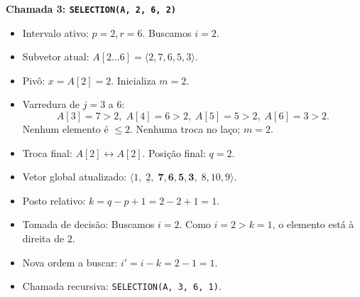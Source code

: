 \documentclass[11pt,a4paper]{article}
\newcommand{\destaque}[1]{\textbf{\color{azul}#1}}
\begin{document}
\vspace{4pt}
\destaque{Chamada 3: \texttt{SELECTION(A, 2, 6, 2)}}
\begin{itemize}
    \item Intervalo ativo: $p = 2, r = 6$. Buscamos $i = 2$.
    \item Subvetor atual: $A[2 \dots 6] = \langle 2, 7, 6, 5, 3 \rangle$.
    \item Pivô: $x = A[2] = 2$. Inicializa $m = 2$.
    \item Varredura de $j = 3$ a $6$:
    \[
    A[3]=7 > 2, \; A[4]=6 > 2, \; A[5]=5 > 2, \; A[6]=3 > 2.
    \]
    Nenhum elemento é $\le 2$. Nenhuma troca no laço; $m = 2$.
    \item Troca final: $A[2] \leftrightarrow A[2]$. Posição final: $q = 2$.
    \item Vetor global atualizado: $\langle 1, \;\underline{2},\; \mathbf{7, 6, 5, 3},\; 8, 10, 9 \rangle$.
    \item Posto relativo: $k = q - p + 1 = 2 - 2 + 1 = 1$.
    \item Tomada de decisão: Buscamos $i = 2$. Como $i = 2 > k = 1$, o elemento está à direita de $2$.
    \item Nova ordem a buscar: $i' = i - k = 2 - 1 = 1$.
    \item Chamada recursiva: \texttt{SELECTION(A, 3, 6, 1)}.
\end{itemize}
\end{document}
